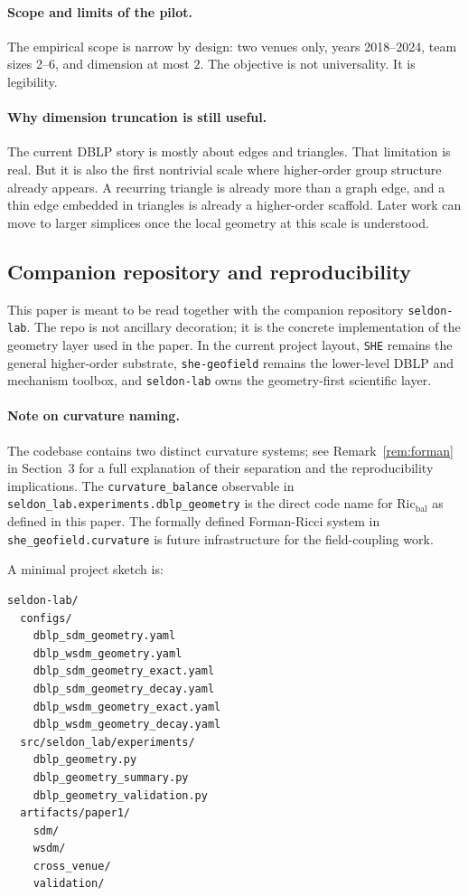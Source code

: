 \documentclass[11pt]{article}
\newcommand{\Ric}{\mathrm{Ric}}
\begin{document}
\paragraph{Scope and limits of the pilot.}
The empirical scope is narrow by design: two venues only, years 2018--2024, team sizes 2--6, and dimension at most $2$. The objective is not universality. It is legibility.

\paragraph{Why dimension truncation is still useful.}
The current DBLP story is mostly about edges and triangles. That limitation is real. But it is also the first nontrivial scale where higher-order group structure already appears. A recurring triangle is already more than a graph edge, and a thin edge embedded in triangles is already a higher-order scaffold. Later work can move to larger simplices once the local geometry at this scale is understood.

\subsection{Companion repository and reproducibility}

This paper is meant to be read together with the companion repository
\texttt{seldon-lab}. The repo is not ancillary decoration; it is the concrete
implementation of the geometry layer used in the paper. In the current project
layout, \texttt{SHE} remains the general higher-order substrate,
\texttt{she-geofield} remains the lower-level DBLP and mechanism toolbox, and
\texttt{seldon-lab} owns the geometry-first scientific layer.

\paragraph{Note on curvature naming.}
The codebase contains two distinct curvature systems; see Remark~\ref{rem:forman} in Section~3 for a full explanation of their separation and the reproducibility implications.
The \texttt{curvature\_balance} observable in \texttt{seldon\_lab.experiments.dblp\_geometry} is the direct code name for $\Ric_{\mathrm{bal}}$ as defined in this paper.
The formally defined Forman-Ricci system in \texttt{she\_geofield.curvature} is future infrastructure for the field-coupling work.

A minimal project sketch is:
\begin{verbatim}
seldon-lab/
  configs/
    dblp_sdm_geometry.yaml
    dblp_wsdm_geometry.yaml
    dblp_sdm_geometry_exact.yaml
    dblp_sdm_geometry_decay.yaml
    dblp_wsdm_geometry_exact.yaml
    dblp_wsdm_geometry_decay.yaml
  src/seldon_lab/experiments/
    dblp_geometry.py
    dblp_geometry_summary.py
    dblp_geometry_validation.py
  artifacts/paper1/
    sdm/
    wsdm/
    cross_venue/
    validation/
\end{verbatim}
\end{document}
